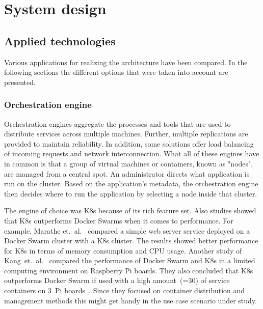 \chapter{System design} %

\label{chap:design} %



\section{Applied technologies}
Various applications for realizing the architecture have been compared. In the following sections the different options that were taken into account are presented. 


\subsection{Orchestration engine}
Orchestration engines aggregate the processes and tools that are used to distribute services across multiple machines. Further, multiple replications are provided to maintain reliability. In addition, some solutions offer load balancing of incoming requests and network interconnection.
What all of these engines have in common is that a group of virtual machines or containers, known as "nodes", are managed from a central spot. An administrator directs what application is run on the cluster. Based on the application's metadata, the orchestration engine then decides where to run the application by selecting a node inside that cluster.

The engine of choice was \ac{K8s} because of its rich feature set.
Also studies showed that \ac{K8s} outperforms Docker Swarms when it comes to performance. For example, Marathe et.~al.~\cite{Marathe.2019} compared a simple web server service deployed on a Docker Swarm cluster with a \ac{K8s} cluster. The results showed better performance for \ac{K8s} in terms of memory consumption and CPU usage. Another study of Kang~et.~al.~\cite{Kang.2021} compared the performance of Docker Swarm and \ac{K8s} in a limited computing environment on Raspberry Pi boards. They also concluded that \ac{K8s} outperforms Docker Swarm if used with a high amount~(=30) of service containers on 3~Pi boards~\cite{Kang.2021}. Since they focused on container distribution and management methods this might get handy in the use case scenario under study.

